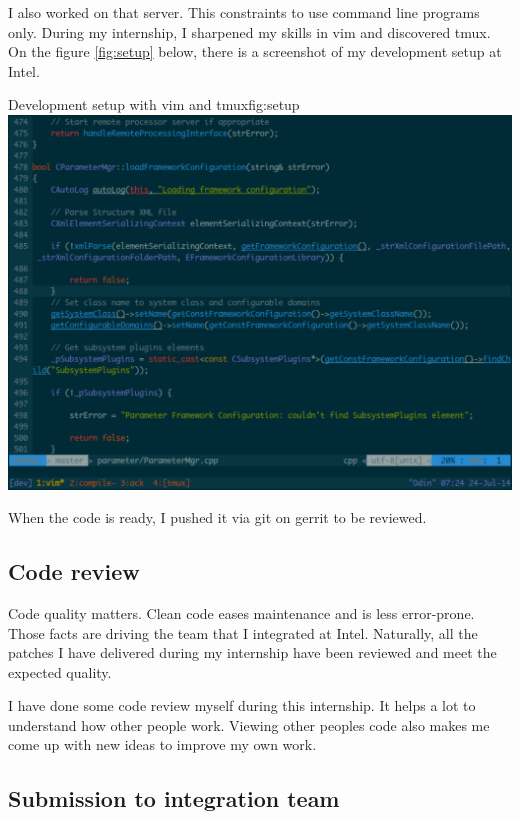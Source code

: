 I also worked on that server. This constraints to use command line programs only.
During my internship, I sharpened my skills in \gls{vim} and discovered \gls{tmux}.
On the figure \ref{fig:setup} below, there is a screenshot of my development setup at Intel.

\begin{figureGraphics}{Development setup with vim and tmux}{fig:setup}
\includegraphics[width=\textwidth]{./src/img/setup.pdf}
\end{figureGraphics}

When the code is ready, I pushed it via \gls{git} on \gls{gerrit} to be reviewed.

\subsection{Code review}
Code quality matters. Clean code eases maintenance and is less error-prone.
Those facts are driving the team that I integrated at Intel. Naturally, all the
patches I have delivered during my internship have been reviewed and meet the
expected quality.

I have done some code review myself during this internship. It helps a lot to
understand how other people work. Viewing other peoples code also makes me come
up with new ideas to improve my own work.

\subsection{Submission to integration team}

